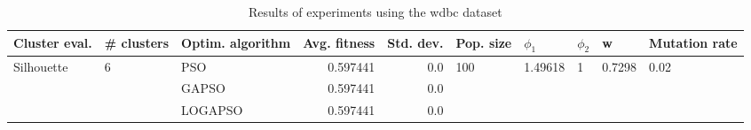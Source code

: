 \begin{table}
\centering
\caption{Results of experiments using the wdbc dataset}
\begin{tabular}{lllrrlllll}
\toprule
              Cluster eval. &        \# clusters & Optim. algorithm &  Avg. fitness &  Std. dev. &            Pop. size &               $\phi_{1}$ &         $\phi_{2}$ &                       w &         Mutation rate \\
\midrule
\multirow{3}{*}{Silhouette} & \multirow{3}{*}{6} &              PSO &      0.597441 &        0.0 & \multirow{3}{*}{100} & \multirow{3}{*}{1.49618} & \multirow{3}{*}{1} & \multirow{3}{*}{0.7298} & \multirow{3}{*}{0.02} \\
                            &                    &            GAPSO &      0.597441 &        0.0 &                      &                          &                    &                         &                       \\
                            &                    &          LOGAPSO &      0.597441 &        0.0 &                      &                          &                    &                         &                       \\
\bottomrule
\end{tabular}
\end{table}
